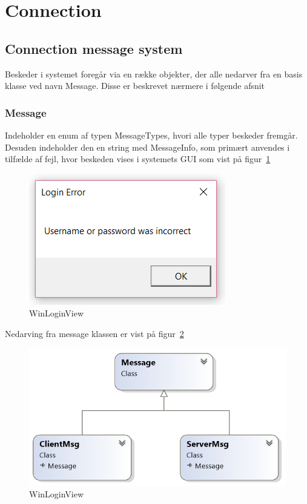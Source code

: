 \section{Connection}

\subsection{Connection message system}

Beskeder i systemet foregår via en række objekter, der alle nedarver fra en basis klasse ved navn Message. Disse er beskrevet nærmere i følgende afsnit

\subsubsection{Message}
Indeholder en enum af typen MessageTypes, hvori alle typer beskeder fremgår. Desuden indeholder den en string med MessageInfo, som primært anvendes i tilfælde af fejl, hvor beskeden vises i systemets GUI som vist på figur~\ref{fig:loginError}

\begin{figure}
	\centering
	\includegraphics[width=0.7\linewidth]{figs/connection/loginError.png}
	\caption{WinLoginView}
	\label{fig:loginError}
\end{figure}

Nedarving fra message klassen er vist på figur~\ref{fig:MessageUML}

\begin{figure}
	\centering
	\includegraphics[width=0.7\linewidth]{figs/connection/MessageUML.png}
	\caption{WinLoginView}
	\label{fig:MessageUML}
\end{figure}

